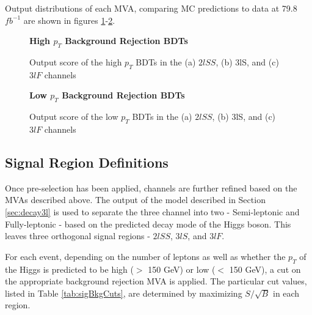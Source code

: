 Output distributions of each MVA, comparing MC predictions to data at 79.8 $fb^{-1}$ are shown in figures \ref{fig:sigBkgScoreHigh}-\ref{fig:sigBkgScoreLow}. 

\begin{figure}
  \centering
  \textbf{High $p_T$ Background Rejection BDTs}
  \\
  \caption{Output score of the high $p_T$ BDTs in the (a) $2lSS$, (b) 3lS, and (c) $3lF$ channels}
  \label{fig:sigBkgScoreHigh}
\end{figure}

\begin{figure}
  \centering
  \textbf{Low $p_T$ Background Rejection BDTs}
  \\
  \label{fig:sigBkgScoreLow}
  \caption{Output score of the low $p_T$ BDTs in the (a) $2lSS$, (b) 3lS, and (c) $3lF$ channels} 
\end{figure}


\subsection{Signal Region Definitions}
\label{subsec:sigRegions}

Once pre-selection has been applied, channels are further refined based on the MVAs described above. The output of the model described in Section \ref{sec:decay3l} is used to separate the three channel into two - Semi-leptonic and Fully-leptonic - based on the predicted decay mode of the Higgs boson. This leaves three orthogonal signal regions - $2lSS$, $3lS$, and $3lF$. 

For each event, depending on the number of leptons as well as whether the $p_T$ of the Higgs is predicted to be high ($>$ 150 GeV) or low ($<$ 150 GeV), a cut on the appropriate background rejection MVA is applied. The particular cut values, listed in Table \ref{tab:sigBkgCuts}, are determined by maximizing $S/\sqrt{B}$ in each region. 

